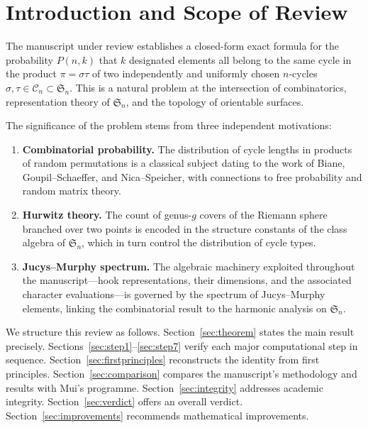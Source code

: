 \documentclass[12pt, a4paper]{amsart}
\theoremstyle{plain}
\theoremstyle{definition}
\theoremstyle{remark}
\newcommand{\C}{\mathcal{C}}
\newcommand{\Sn}{\mathfrak{S}_n}
\begin{document}
\section{Introduction and Scope of Review}

The manuscript under review establishes a closed-form exact formula for the
probability $P(n,k)$ that $k$ designated elements all belong to the same cycle
in the product $\pi = \sigma\tau$ of two independently and uniformly chosen
$n$-cycles $\sigma,\tau \in \C_n \subset \Sn$.  This is a natural problem at
the intersection of combinatorics, representation theory of $\Sn$, and the
topology of orientable surfaces.

The significance of the problem stems from three independent motivations:
\begin{enumerate}[label=(\roman*)]
  \item \textbf{Combinatorial probability.} The distribution of cycle lengths in
        products of random permutations is a classical subject dating to the work of
        Biane, Goupil--Schaeffer, and Nica--Speicher, with connections to
        free probability and random matrix theory.
  \item \textbf{Hurwitz theory.} The count of genus-$g$ covers of the Riemann
        sphere branched over two points is encoded in the structure constants of
        the class algebra of $\Sn$, which in turn control the distribution of
        cycle types.
  \item \textbf{Jucys--Murphy spectrum.} The algebraic machinery exploited
        throughout the manuscript—hook representations, their dimensions, and
        the associated character evaluations—is governed by the spectrum of
        Jucys--Murphy elements, linking the combinatorial result to the
        harmonic analysis on $\Sn$.
\end{enumerate}

We structure this review as follows.  Section~\ref{sec:theorem} states the main
result precisely.  Sections~\ref{sec:step1}--\ref{sec:step7} verify each major
computational step in sequence.  Section~\ref{sec:firstprinciples} reconstructs
the identity from first principles.  Section~\ref{sec:comparison} compares the
manuscript's methodology and results with Mui's programme.
Section~\ref{sec:integrity} addresses academic integrity.
Section~\ref{sec:verdict} offers an overall verdict.
Section~\ref{sec:improvements} recommends mathematical improvements.
\end{document}
